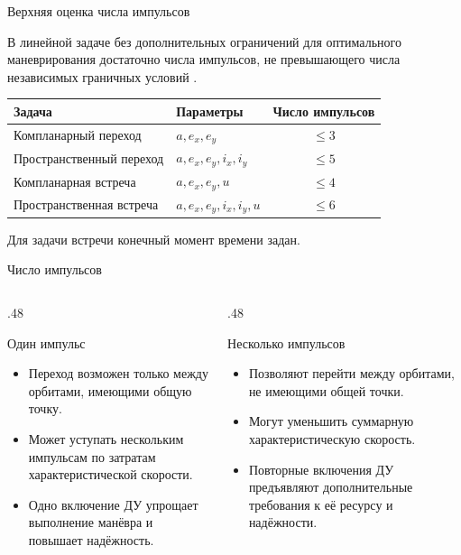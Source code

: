 \documentclass[11pt,aspectratio=169,t]{beamer}
\begin{document}
\begin{frame}{Верхняя оценка числа импульсов}
\relax
{\justifying
В линейной задаче без дополнительных ограничений для оптимального маневрирования достаточно числа импульсов, не превышающего числа независимых граничных условий \cite{Edelbaum1966,Neustadt1964,SternPotter1965}.\par}
\medskip
\begin{center}
\renewcommand{\arraystretch}{1.2}
\begin{tabular}{@{}l@{\qquad}l@{\qquad}c@{}}
\toprule
Задача & Параметры & Число импульсов\\
\midrule
Компланарный переход & $a,e_x,e_y$ & $\leq 3$\\
Пространственный переход & $a,e_x,e_y,i_x,i_y$ & $\leq 5$\\
Компланарная встреча & $a,e_x,e_y,u$ & $\leq 4$\\
Пространственная встреча & $a,e_x,e_y,i_x,i_y,u$ & $\leq 6$\\
\bottomrule
\end{tabular}
\end{center}
\smallskip
Для задачи встречи конечный момент времени задан.
\end{frame}

\begin{frame}{Число импульсов}
\relax
\begin{columns}[T,onlytextwidth]
\begin{column}{.48\textwidth}
\begin{block}{Один импульс}
\begin{itemize}
 \setlength{\itemsep}{5pt}
 \item Переход возможен только между орбитами, имеющими общую точку.
 \item Может уступать нескольким импульсам по затратам характеристической скорости.
 \item Одно включение ДУ упрощает выполнение манёвра и повышает надёжность.
\end{itemize}
\end{block}
\end{column}
\begin{column}{.48\textwidth}
\begin{block}{Несколько импульсов}
\begin{itemize}
 \setlength{\itemsep}{5pt}
 \item Позволяют перейти между орбитами, не имеющими общей точки.
 \item Могут уменьшить суммарную характеристическую скорость.
 \item Повторные включения ДУ предъявляют дополнительные требования к её ресурсу и надёжности.
\end{itemize}
\end{block}
\end{column}
\end{columns}
\end{frame}
\end{document}
